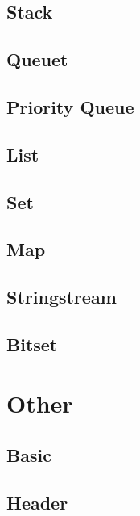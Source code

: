 \subsection{Stack}


\subsection{Queuet}


\subsection{Priority Queue}


\subsection{List}


\subsection{Set}


\subsection{Map}


\subsection{Stringstream}


\subsection{Bitset}






\section{Other}

\subsection{Basic}


\subsection{Header}


